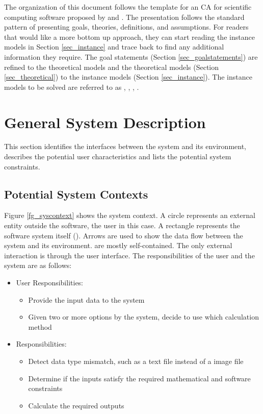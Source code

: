 \documentclass[12pt]{article}
\begin{document}
The organization of this document follows the template for an CA for scientific computing software proposed by \cite{Parnas1972} and \cite{ParnasAndClements1986}. The presentation follows the standard pattern of presenting goals, theories, definitions, and assumptions. For readers that would like a more bottom up approach, they can start reading the instance
models in Section \ref{sec_instance} and trace back to find any additional information they require.
The goal statements (Section \ref{sec_goalstatements}) are refined to the theoretical models and the theoretical models (Section \ref{sec_theoretical}) to the instance models (Section \ref{sec_instance}). The instance models to be solved are referred to as , , , .

\section{General System Description}

This section identifies the interfaces between the system and its environment,
describes the potential user characteristics and lists the potential system
constraints.

\subsection{Potential System Contexts}

Figure \ref{fg_syscontext} shows the system context. A circle represents an external entity outside the software, the user in this case. A rectangle represents the software system itself (\famname).
Arrows are used to show the data flow between the system and its environment.
\famname{} are mostly self-contained. The only external interaction is through the user interface. The responsibilities of the user and the system are as follows:

\begin{itemize}
\item User Responsibilities:
\begin{itemize}
\item Provide the input data to the system
\item Given two or more options by the system, decide to use which calculation method
\end{itemize}
\item \famname{} Responsibilities:
\begin{itemize}
\item Detect data type mismatch, such as a text file instead of a image file
\item Determine if the inputs satisfy the required mathematical and software constraints
\item Calculate the required outputs
\end{itemize}
\end{itemize}
\end{document}
